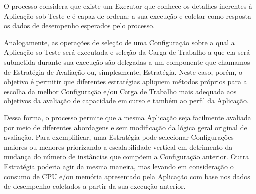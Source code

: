 O processo considera que existe um Executor que conhece os detalhes inerentes à 
Aplicação sob Teste e é capaz de ordenar a sua execução e coletar como resposta
os dados de desempenho esperados pelo processo.

Analogamente, as operações de seleção de uma Configuração sobre a qual a Aplicação
so Teste será executada e seleção da Carga de Trabalho a que ela será submetida 
durante sua execução são delegadas a um componente que chamamos de Estratégia de
Avaliação ou, simplesmente, Estratégia. Neste caso, porém, o objetivo é permitir
que diferentes estratégias apliquem métodos próprios para a escolha da melhor 
Configuração e/ou Carga de Trabalho mais adequada aos objetivos da avaliação de
capacidade em curso e também ao perfil da Aplicação.

Dessa forma, o processo permite que a mesma Aplicação seja facilmente avaliada 
por meio de diferentes abordagens e sem modificação da lógica geral original de 
avaliação. Para exemplificar, uma Estratégia pode selecionar Configurações 
maiores ou menores priorizando a escalabilidade vertical em detrimento da mudança
do número de instâncias que compõem a Configuração anterior. Outra Estratégia 
poderia agir da mesma maneira, mas levando em consideração o consumo de CPU e/ou
memória apresentado pela Aplicação com base nos dados de desempenho coletados a
partir da sua execução anterior.

